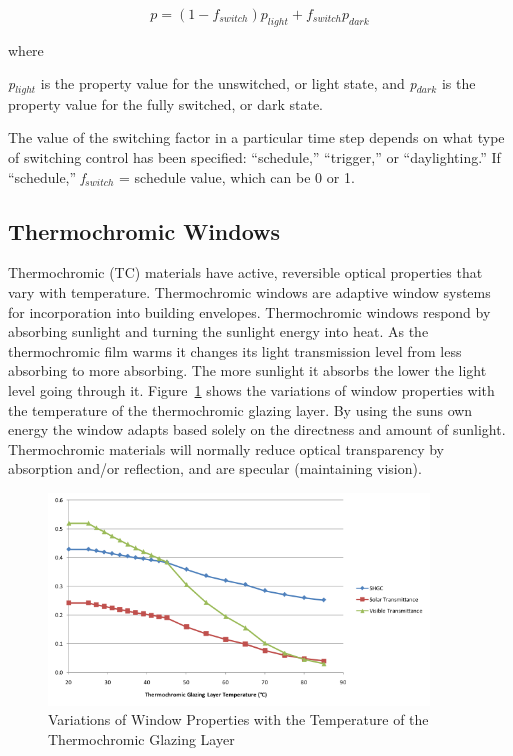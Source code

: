 \begin{equation}
p = (1 - {f_{switch}}){p_{light}} + {f_{switch}}{p_{dark}}
\end{equation}

where

\emph{p\(_{light}\)} is the property value for the unswitched, or light state, and \emph{p\(_{dark}\)} is the property value for the fully switched, or dark state.

The value of the switching factor in a particular time step depends on what type of switching control has been specified: ``schedule,'' ``trigger,'' or ``daylighting.'' If ``schedule,'' \emph{f\(_{switch}\)} = schedule value, which can be 0 or 1.

\subsection{Thermochromic Windows}\label{thermochromic-windows}

Thermochromic (TC) materials have active, reversible optical properties that vary with temperature. Thermochromic windows are adaptive window systems for incorporation into building envelopes. Thermochromic windows respond by absorbing sunlight and turning the sunlight energy into heat. As the thermochromic film warms it changes its light transmission level from less absorbing to more absorbing. The more sunlight it absorbs the lower the light level going through it. Figure~\ref{fig:variations-of-window-properties-with} shows the variations of window properties with the temperature of the thermochromic glazing layer. By using the suns own energy the window adapts based solely on the directness and amount of sunlight. Thermochromic materials will normally reduce optical transparency by absorption and/or reflection, and are specular (maintaining vision).

\begin{figure}[hbtp] %
\centering
\includegraphics[width=0.9\textwidth, height=0.9\textheight, keepaspectratio=true]{media/image1015.svg.png}
\caption{Variations of Window Properties with the Temperature of the Thermochromic Glazing Layer \protect \label{fig:variations-of-window-properties-with}}
\end{figure}

